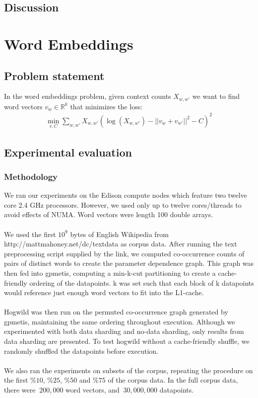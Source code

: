 \documentclass[times,11pt]{article}
\numberwithin{equation}{section}		%
\numberwithin{figure}{section}			%
\numberwithin{table}{section}				%
\newcommand{\ltwonorm}[1]{\left|\left|{#1}\right|\right|}
\begin{document}
\subsection{Discussion}















\section{Word Embeddings}\label{sec:w2v}

\subsection{Problem statement}
In the word embeddings problem, given context counts $X_{w,w'}$ we want to find word vectors
$v_{w} \in \mathbb{R}^{k}$ that minimizes the loss:
\begin{align*}
\min_{v,C}\sum_{w,w'}X_{w,w'} \left(\log(X_{w,w'}) - \ltwonorm{v_w+v_{w'}}^2 - C\right)^2
\end{align*}

\subsection{Experimental evaluation}
\subsubsection{Methodology}

We ran our experiments on the Edison compute nodes which feature two
twelve core 2.4 GHz processors. However, we used only up to twelve
cores/threads to avoid effects of NUMA. Word vectors were length 100
double arrays.
\\\\
We used the first $10^9$ bytes of English Wikipedia from
http://mattmahoney.net/dc/textdata as corpus data. After running the text
preprocessing script supplied by the link, we computed co-occurrence
counts of pairs of distinct words to create the parameter dependence graph.
This graph was then fed into gpmetis, computing a min-k-cut partitioning to
create a cache-friendly ordering of the datapoints. k was set such that each
block of k datapoints would reference just enough word vectors to fit into the
L1-cache.
\\\\
Hogwild was then run on the permuted co-occurrence graph generated by gpmetis,
maintaining the same ordering throughout execution. Although we experimented with
both data sharding and no-data sharding, only results from data sharding are presented.
To test hogwild without a cache-friendly shuffle, we randomly shuffled the datapoints before execution.
\\\\
We also ran the experiments on subsets of the corpus, repeating the
procedure on the first $\%10$, $\%25$, $\%50$ and $\%75$ of the corpus data.
In the full corpus data, there were $~200,000$ word vectors, and $~30,000,000$
datapoints.
\end{document}
